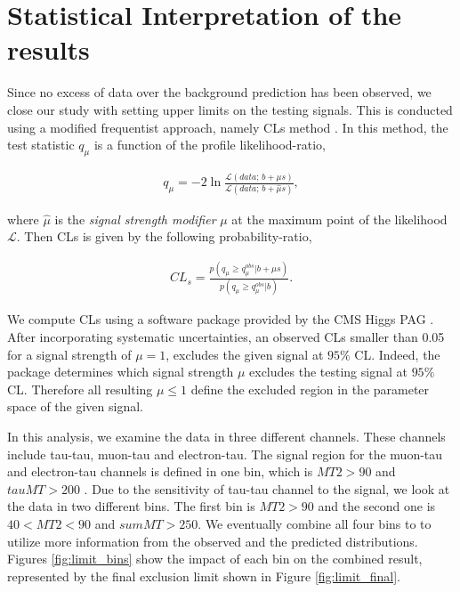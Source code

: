 
\section[Statistics]{Statistical Interpretation of the results}\label{sect:stat}

Since no excess of data over the background prediction has been observed, 
we close our study with setting upper limits on the testing signals.
This is conducted using a modified frequentist approach, namely CLs method \cite{read:CLs}.
In this method, the test statistic $q_\mu$ \cite{cowan:asymptoticCLs} is a function of the profile likelihood-ratio,

\begin{align}
q_\mu = -2 \ln \frac{\mathcal{L}(data ;\, b + \mu s)}{\mathcal{L}(data ;\, b + \hat{\mu} s)},
\end{align}

where $\hat\mu$ is the \textit{signal strength modifier} $\mu$ at the maximum point of the likelihood $\mathcal{L}$.
Then CLs is given by the following probability-ratio,

\begin{align}
CL_s = \frac{p(q_\mu \geq q_\mu^{obs} | b + \mu s )}{p(q_\mu \geq q_\mu^{obs} | b)}.
\end{align}
 
We compute CLs using a software package provided by the CMS Higgs PAG \cite{higgspag:software}.
After incorporating systematic uncertainties, an observed CLs smaller than 0.05 for a signal strength of $\mu = 1$, excludes the given signal at $95\%$ CL. Indeed, the package determines which signal strength $\mu$ excludes the testing signal at $95\%$ CL. Therefore all resulting $\mu \leq 1$ define the excluded region in the parameter space of the given signal. 

In this analysis, we examine the data in three different channels.
These channels include tau-tau, muon-tau and electron-tau.
The signal region for the muon-tau and electron-tau channels is defined in one bin, which is $MT2 > 90$ and $tauMT > 200$ .
Due to the sensitivity of tau-tau channel to the signal, we look at the data in two different bins.
The first bin is $MT2 > 90$ and the second one is $40 < MT2 < 90$ and $sumMT>250$.
We eventually combine all four bins to to utilize more information from the observed and the predicted distributions.
Figures \ref{fig:limit_bins} show the impact of each bin on the combined result, represented by the final exclusion limit shown in Figure \ref{fig:limit_final}.  

